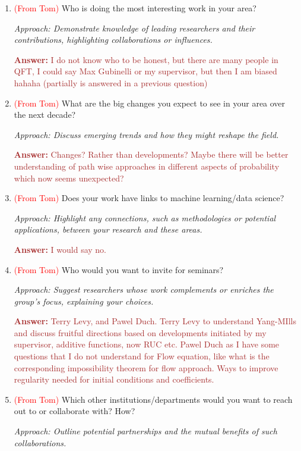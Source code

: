 \documentclass[12pt]{article}
\numberwithin{equation}{section}
\newcommand{\brown}[1]{\textcolor{brown}{#1}}
\newcommand{\red}[1]{\textcolor{red}{#1}}
\begin{document}
\begin{enumerate}
    \item \red{(From Tom)} Who is doing the most interesting work in your area?
    
    \textit{Approach: Demonstrate knowledge of leading researchers and their contributions, highlighting collaborations or influences.}

    \brown{\textbf{Answer:} I do not know who to be honest, but there are many people in QFT, I could say Max Gubinelli or my supervisor, but then I am biased hahaha (partially is answered in a previous question)}

    \item \red{(From Tom)} What are the big changes you expect to see in your area over the next decade?
    
    \textit{Approach: Discuss emerging trends and how they might reshape the field.}

    \brown{\textbf{Answer:} Changes? Rather than developments? Maybe there will be better understanding of path wise approaches in different aspects of probability which now seems unexpected?}

    \item \red{(From Tom)} Does your work have links to machine learning/data science?
    
    \textit{Approach: Highlight any connections, such as methodologies or potential applications, between your research and these areas.}

    \brown{\textbf{Answer:} I would say no.}

    \item \red{(From Tom)} Who would you want to invite for seminars?
    
    \textit{Approach: Suggest researchers whose work complements or enriches the group’s focus, explaining your choices.}

    \brown{\textbf{Answer:} Terry Levy, and Pawel Duch. Terry Levy to understand Yang-MIlls and discuss fruitful directions based on developments initiated by my supervisor, additive functions, now RUC etc. Pawel Duch as I have some questions that I do not understand for Flow equation, like what is the corresponding impossibility theorem for flow approach. Ways to improve regularity needed for initial conditions and coefficients.}

    \item \red{(From Tom)} Which other institutions/departments would you want to reach out to or collaborate with? How?
    
    \textit{Approach: Outline potential partnerships and the mutual benefits of such collaborations.}


\end{enumerate}
\end{document}
